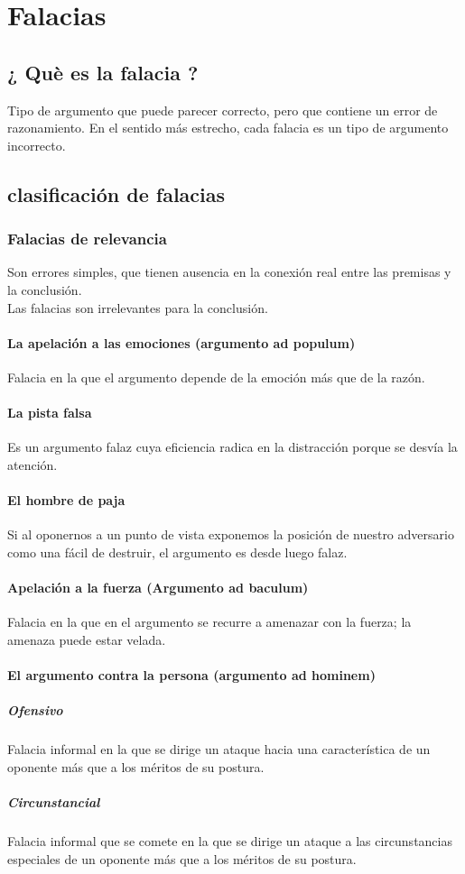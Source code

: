\documentclass[10pt]{book} 						%
\begin{document}
\section{Falacias}
\subsection{¿ Què es la falacia  ?}
Tipo de argumento que puede parecer correcto, pero que contiene un error de razonamiento. En el sentido más estrecho, cada falacia es un tipo de argumento incorrecto.
\subsection{clasificación de falacias}
\subsubsection{Falacias de relevancia}
Son errores simples, que tienen ausencia en la conexión real entre las premisas y la conclusión.\\
Las falacias son irrelevantes para la conclusión.
\paragraph{La apelación a las emociones (argumento ad populum)}
Falacia en la que el argumento depende de la emoción más que de la razón.
\paragraph{La pista falsa}
Es un argumento falaz cuya eficiencia radica en la distracción porque se desvía la atención.
\paragraph{El hombre de paja}
Si al oponernos a un punto de vista exponemos la posición de nuestro adversario como una fácil de destruir, el argumento es desde luego falaz.
\paragraph{Apelación a la fuerza (Argumento ad baculum)}
Falacia en la que en el argumento se recurre a amenazar con la fuerza; la amenaza puede estar velada.
\paragraph{El argumento contra la persona (argumento ad hominem)}
\subparagraph{Ofensivo}
Falacia informal en la que se dirige un ataque hacia una característica de un oponente más que a los méritos de su postura.
\subparagraph{Circunstancial}
Falacia informal que se comete en la que se dirige un ataque a las circunstancias especiales de un oponente más que a los méritos de su postura.
\end{document}
